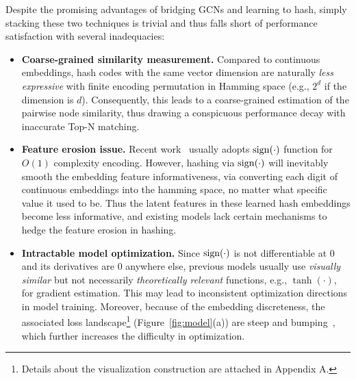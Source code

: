 Despite the promising advantages of bridging GCNs and learning to hash,
simply stacking these two techniques is trivial and thus falls short of performance satisfaction with several inadequacies:
\begin{itemize}[leftmargin=*]

\item \textbf{Coarse-grained similarity measurement.}
Compared to continuous embeddings, hash codes with the same vector dimension are naturally \textit{less expressive} with finite encoding permutation in Hamming space (e.g., $2^d$ if the dimension is $d$).
Consequently, this leads to a coarse-grained estimation of the pairwise node similarity, thus drawing a conspicuous performance decay with inaccurate Top-N matching.


\item \textbf{Feature erosion issue.}
Recent work~\cite{qin2020forward,rastegari2016xnor,lin2017towards,hashgnn} usually adopts $\operatorname{sign}(\cdot)$ function for $O(1)$ complexity encoding.
However, hashing via $\operatorname{sign}(\cdot)$ will inevitably smooth the embedding feature informativeness, via converting each digit of continuous embeddings into the hamming space, no matter what specific value it used to be.
Thus the latent features in these learned hash embeddings become less informative, and existing models lack certain mechanisms to hedge the feature erosion in hashing.


\item \textbf{Intractable model optimization.}
Since $\operatorname{sign}(\cdot)$ is not differentiable at 0 and its derivatives are 0 anywhere else, previous models usually use \textit{visually similar} but not necessarily \textit{theoretically relevant} functions, e.g., $\tanh(\cdot)$, for gradient estimation.
This may lead to inconsistent optimization directions in model training.
Moreover, because of the embedding discreteness, the associated loss landscape\footnote{\scriptsize Details about the visualization construction are attached in Appendix A.} (Figure~\ref{fig:model}(a)) are steep and bumping~\cite{bai2020binarybert}, which further increases the difficulty in optimization.
\end{itemize}


